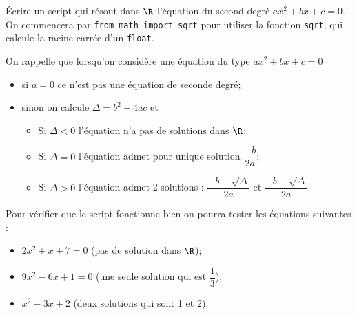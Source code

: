 \begin{exercice}
	\'Ecrire un script qui résout dans $\R$ l'équation du second degré $ax^2+bx+c=0$.\\
	On commencera par \texttt{from math import sqrt} pour utiliser la fonction \texttt{sqrt}, qui calcule la racine carrée d'un \texttt{float}.
	
	On rappelle que lorsqu'on considère une équation du type $ax^2+bx+c=0$
	\begin{itemize}
		\item   si $a=0$ ce n'est pas une équation de seconde degré;
		\item   sinon on calcule $\Delta = b^2-4ac$ et
		      \begin{itemize}
			      \item   Si $\Delta<0$ l'équation n'a pas de solutions dans $\R$;
			      \item   Si $\Delta=0$ l'équation admet pour unique solution $\dfrac{-b}{2a}$;
			      \item   Si $\Delta>0$ l'équation admet 2 solutions : $\dfrac{-b-\sqrt{\Delta}}{2a}$ et $\dfrac{-b+\sqrt{\Delta}}{2a}$.
		      \end{itemize}
	\end{itemize}
	Pour vérifier que le script fonctionne bien on pourra tester les équations suivantes :
	\begin{itemize}
		\item   $2x^2+x+7=0$ (pas de solution dans $\R$);
		\item   $9x^2-6x+1=0$ (une seule solution qui est $\dfrac{1}{3}$);
		\item   $x^2-3x+2$ (deux solutions qui sont 1 et 2).
	\end{itemize}
\end{exercice}

